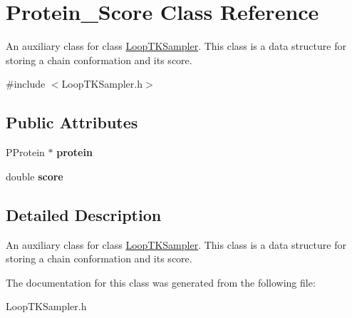 \hypertarget{classProtein__Score}{\section{Protein\-\_\-\-Score Class Reference}
\label{classProtein__Score}
}


An auxiliary class for class \hyperlink{classLoopTKSampler}{Loop\-T\-K\-Sampler}. This class is a data structure for storing a chain conformation and its score.  




{\ttfamily \#include $<$Loop\-T\-K\-Sampler.\-h$>$}

\subsection*{Public Attributes}
\begin{DoxyCompactItemize}
\item 
\hypertarget{classProtein__Score_a60756c2713d20bd5aaadd3f3e8005b7a}{P\-Protein $\ast$ {\bfseries protein}}\label{classProtein__Score_a60756c2713d20bd5aaadd3f3e8005b7a}

\item 
\hypertarget{classProtein__Score_a8e2b7edc38055d9e2efb9c93c8aae3c4}{double {\bfseries score}}\label{classProtein__Score_a8e2b7edc38055d9e2efb9c93c8aae3c4}

\end{DoxyCompactItemize}


\subsection{Detailed Description}
An auxiliary class for class \hyperlink{classLoopTKSampler}{Loop\-T\-K\-Sampler}. This class is a data structure for storing a chain conformation and its score. 

The documentation for this class was generated from the following file\-:\begin{DoxyCompactItemize}
\item 
Loop\-T\-K\-Sampler.\-h\end{DoxyCompactItemize}
